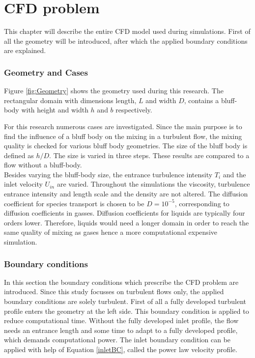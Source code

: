 \documentclass{CFD2017}
\begin{document}
\section{CFD problem}
This chapter will describe the entire CFD model used during simulations. First of all the geometry will be introduced, after which the applied boundary conditions are explained.

\subsubsection{Geometry and Cases}
Figure \ref{fig:Geometry} shows the geometry used during this research. The rectangular domain with dimensions length, $L$ and width $D$, contains a bluff-body with height and width $h$ and $b$ respectively.


For this research numerous cases are investigated. Since the main purpose is to find the influence of a bluff body on the mixing in a turbulent flow, the mixing quality is checked for various bluff body geometries. The size of the bluff body is defined as $h/D$. The size is varied in three steps. These results are compared to a flow without a bluff-body.\\
Besides varying the bluff-body size, the entrance turbulence intensity $T_i$ and the inlet velocity $U_{in}$ are varied. 
Throughout the simulations the viscosity, turbulence entrance intensity and length scale and the density are not altered. The diffusion coefficient for species transport is chosen to be $D=10^{-5}$, corresponding to diffusion coefficients in gasses. Diffusion coefficients for liquids are typically four orders lower. Therefore, liquids would need a longer domain in order to reach the same quality of mixing as gases hence a more computational expensive simulation. 


\subsubsection{Boundary conditions}
In this section the boundary conditions which prescribe the CFD problem are introduced. Since this study focusses on turbulent flows only, the applied boundary conditions are solely turbulent. First of all a fully developed turbulent profile enters the geometry at the left side. This boundary condition is applied to reduce computational time. Without the fully developed inlet profile, the flow needs an entrance length and some time to adapt to a fully developed profile, which demands computational power. The inlet boundary condition can be applied with help of Equation \ref{inletBC}, called the power law velocity profile. \vspace{2mm}
\end{document}
